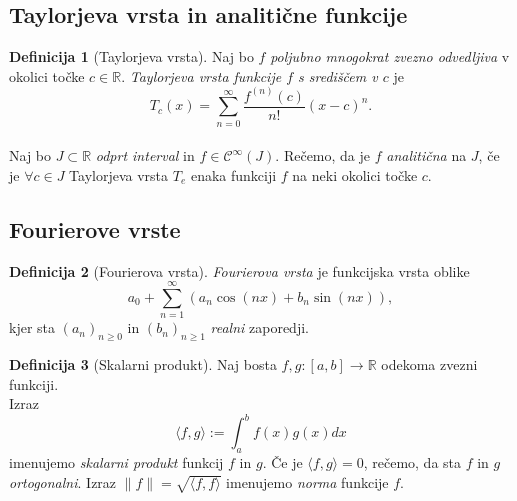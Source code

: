 \documentclass[11pt]{article}
\theoremstyle{definition}
\newtheorem{definicija}{Definicija}[section]
\theoremstyle{definition}
\theoremstyle{definition}
\theoremstyle{theorem}
\begin{document}

\subsection{Taylorjeva vrsta in analitične funkcije}
\vspace{0.5cm}

\begin{definicija}[Taylorjeva vrsta]

Naj bo $f$ \textit{poljubno mnogokrat zvezno odvedljiva} v okolici točke $c \in \mathbb{R}$. \textit{Taylorjeva vrsta funkcije $f$ s središčem v $c$} je 
$$T_c(x) = \sum_{n=0}^{\infty} \frac{f^{(n)}(c)}{n!} (x-c)^n.$$ \\

Naj bo $J \subset \mathbb{R}$ \textit{odprt interval} in $f \in \mathcal{C}^{\infty}(J)$. Rečemo, da je $f$ \textit{analitična} na $J$, če je $\forall c \in J$ Taylorjeva vrsta $T_e$ enaka funkciji $f$ na neki okolici točke $c$.

\end{definicija}
\vspace{0.5cm}


\subsection{Fourierove vrste}
\vspace{0.5cm}

\begin{definicija}[Fourierova vrsta]

\textit{Fourierova vrsta} je funkcijska vrsta oblike
$$a_0 + \sum_{n=1}^{\infty} (a_n \cos(nx) + b_n \sin(nx)),$$
kjer sta $(a_n)_{n \geq 0}$ in $(b_n)_{n \geq 1}$ \textit{realni} zaporedji.

\end{definicija}
\vspace{0.5cm}

\begin{definicija}[Skalarni produkt]

Naj bosta $f, g: [a, b] \rightarrow \mathbb{R}$ odekoma zvezni funkciji. \\ Izraz
$$\langle f, g \rangle := \int_{a}^{b} f(x) g(x) dx$$
imenujemo \textit{skalarni produkt} funkcij $f$ in $g$. Če je $\langle f, g \rangle = 0$, rečemo, da sta $f$ in $g$ \textit{ortogonalni}. Izraz $\| f \| = \sqrt{\langle f, f \rangle}$ imenujemo \textit{norma} funkcije $f$.

\end{definicija}
\vspace{0.5cm}
\end{document}
